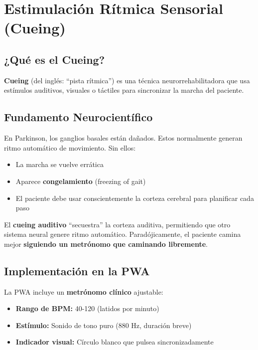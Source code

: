 \documentclass[12pt,a4paper,spanish,oneside]{book}
\begin{document}
\section{Estimulación Rítmica Sensorial (Cueing)}

\subsection{¿Qué es el Cueing?}

\textbf{Cueing} (del inglés: ``pista rítmica'') es una técnica neurorrehabilitadora que usa estímulos auditivos, visuales o táctiles para sincronizar la marcha del paciente.

\subsection{Fundamento Neurocientífico}

En Parkinson, los ganglios basales están dañados. Estos normalmente generan ritmo automático de movimiento. Sin ellos:

\begin{itemize}
  \item La marcha se vuelve errática
  \item Aparece \textbf{congelamiento} (freezing of gait)
  \item El paciente debe usar conscientemente la corteza cerebral para planificar cada paso
\end{itemize}

El \textbf{cueing auditivo} ``secuestra'' la corteza auditiva, permitiendo que otro sistema neural genere ritmo automático. Paradójicamente, el paciente camina mejor \textbf{siguiendo un metrónomo que caminando libremente}.

\subsection{Implementación en la PWA}

La PWA incluye un \textbf{metrónomo clínico} ajustable:

\begin{itemize}
  \item \textbf{Rango de BPM:} 40-120 (latidos por minuto)
  \item \textbf{Estímulo:} Sonido de tono puro (880 Hz, duración breve)
  \item \textbf{Indicador visual:} Círculo blanco que pulsea sincronizadamente
\end{itemize}
\end{document}
